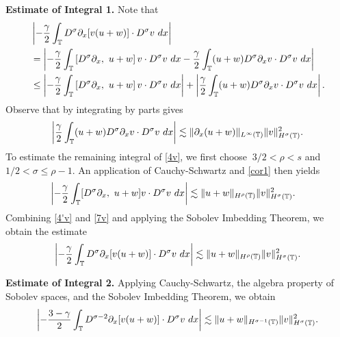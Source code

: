 \textbf{Estimate of Integral 1.} Note that
%
%
\begin{equation}
\begin{split}
& \left |  -\frac{\gamma}{2} \int_{\mathbb{T}} D^\sigma \partial_x [v(u+w)] \cdot
D^\sigma v \ dx \right |
\\
& =
\left |
-\frac{\gamma}{2} \int_{\mathbb{T}} \left[ D^\sigma \partial_x, \ u+w \right]v \cdot
D^\sigma v \ dx - \frac{\gamma}{2} \int_{\mathbb{T}} (u+w) D^\sigma
\partial_x v \cdot D^\sigma v\ dx
\right | \\
& \le \left |
-\frac{\gamma}{2} \int_{\mathbb{T}} \left[ D^\sigma \partial_x, \ u+w \right]v \cdot
D^\sigma v \ dx \right |
+ \left | \frac{\gamma}{2} \int_{\mathbb{T}} (u+w) D^\sigma \partial_x v
\cdot D^\sigma v\
dx \right |.
\label{4v}
\end{split}
\end{equation}
%
%
Observe that by integrating by parts gives
%
%
\begin{equation}
\begin{split}
\left | \frac{\gamma}{2}\int_{\mathbb{T}} (u+w) D^\sigma \partial_x v \cdot
D^\sigma v \ dx \right |
\lesssim \|\partial_x (u+w)\|_{L^\infty(\mathbb{T})}
\|v\|_{H^\sigma(\mathbb{T})}^2.
\label{4'v}
\end{split}
\end{equation}
%
%
%
%
To estimate the remaining integral of \eqref{4v}, we first 
choose $\ 3/2 < \rho
< s$ and $ 1/2 < \sigma \le \rho -1$. An application of 
Cauchy-Schwartz and \cref{cor1} then yields 
%
%
\begin{equation}
\begin{split}
 \left | -\frac{\gamma}{2} \int_{\mathbb{T}} [D^\sigma \partial_x, \ u+w] v
\cdot D^\sigma v \ dx \right |
& \lesssim \|u+w\|_{H^\rho(\mathbb{T})} 
\|v\|_{H^\sigma(\mathbb{T})}^2.
\label{7v}
\end{split}
\end{equation}
%
%
Combining \eqref{4'v} and \eqref{7v} and applying the Sobolev Imbedding 
Theorem, we obtain the estimate
%
%
\begin{equation}
\begin{split}
\left |  -\frac{\gamma}{2} \int_{\mathbb{T}} D^\sigma \partial_x [v(u+w)] \cdot
D^\sigma v \ dx \right |
 \lesssim \|u+w\|_{H^\rho(\mathbb{T})} \|v\|_{H^\sigma(\mathbb{T})}^2.
\label{8v}
\end{split}
\end{equation}
%
%

\textbf{Estimate of Integral 2.} Applying Cauchy-Schwartz, the algebra property of Sobolev spaces, and the 
Sobolev Imbedding Theorem, we obtain 
%
%
%
%
\begin{equation}
\begin{split}
\left | - \frac{3-\gamma}{2} \int_{\mathbb{T}}  D^{\sigma -2}
\partial_x[v(u+w)] \cdot
D^\sigma v \ dx  \right |
 \lesssim \|u+w\|_{H^{\sigma -1}(\mathbb{T})} \|v\|_{H^\sigma(\mathbb{T})}^2.
\label{3v}
\end{split}
\end{equation}
%
%
%

